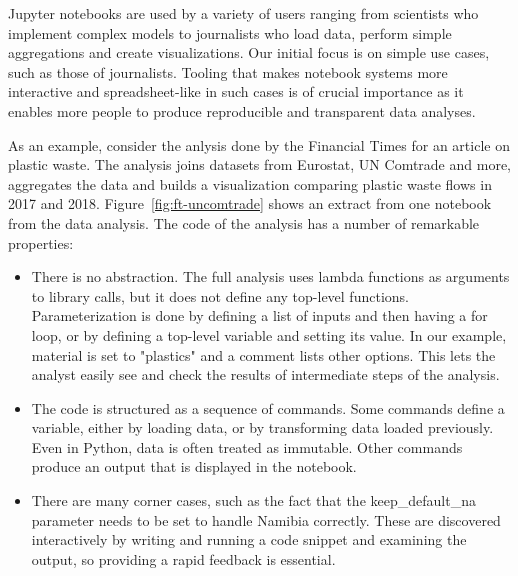 \documentclass[acmsmall,anonymous,fleqn]{acmart}\settopmatter{printfolios=false,printccs=false,printacmref=false}
\theoremstyle{plain}
\theoremstyle{definition}
\newcommand{\str}[1]{\textnormal{\textcolor{strclr}{\sffamily "#1"}}}
\newcommand{\ident}[1]{\textnormal{\textcolor{idclr}{\sffamily #1}}}
\begin{document}

Jupyter notebooks are used by a variety of users ranging from scientists who implement complex
models to journalists who load data, perform simple aggregations and create visualizations. Our
initial focus is on simple use cases, such as those of journalists. Tooling that makes notebook
systems more interactive and spreadsheet-like in such cases is of crucial importance as it enables
more people to produce reproducible and transparent data analyses.

As an example, consider the anlysis done by the Financial Times for an article on plastic
waste. The analysis joins datasets from Eurostat, UN Comtrade and more, aggregates the data and
builds a visualization comparing plastic waste flows in 2017 and 2018.
Figure~\ref{fig:ft-uncomtrade} shows an extract from one notebook from the data analysis.
The code of the analysis has a number of remarkable properties:
%
\begin{itemize}
\item There is no abstraction. The full analysis uses lambda functions as arguments to library calls,
  but it does not define any top-level functions. Parameterization is done by defining a list of
  inputs and then having a for loop, or by defining a top-level variable and setting its value.
  In our example, \ident{material} is set to \str{plastics} and a comment lists other options.
  This lets the analyst easily see and check the results of intermediate steps of the analysis.

\vspace{0.5em}
\item The code is structured as a sequence of commands. Some commands define a variable, either by
  loading data, or by transforming data loaded previously. Even in Python, data is often treated
  as immutable. Other commands produce an output that is displayed in the notebook.

\vspace{0.5em}
\item There are many corner cases, such as the fact that the \ident{keep\_default\_na} parameter
  needs to be set to handle Namibia correctly. These are discovered interactively by writing and
  running a code snippet and examining the output, so providing a rapid feedback is essential.
\end{itemize}
\end{document}
